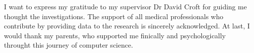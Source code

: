 I want to express my gratitude to my supervisor Dr David Croft for guiding me thought the investigations. 
The support of all medical professionals who contribute by providing data to the research is sincerely acknowledged. 
At last, I would thank my parents, who supported me finically and psychologically throught this journey of computer science.